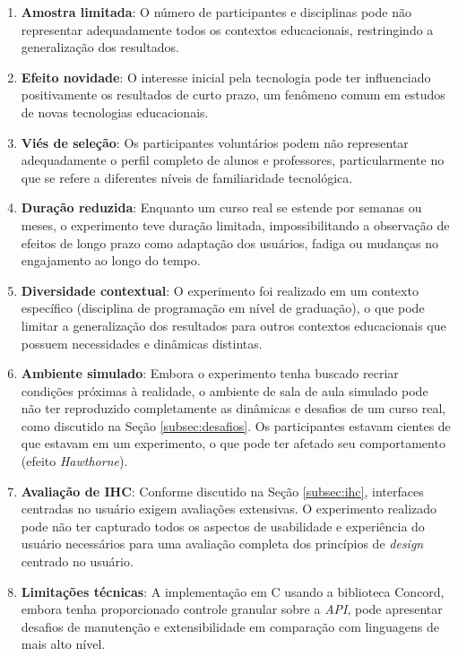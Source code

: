 \begin{enumerate}
\item \textbf{Amostra limitada}: O número de participantes e disciplinas pode
não representar adequadamente todos os contextos educacionais, restringindo a
generalização dos resultados.
\item \textbf{Efeito novidade}: O interesse inicial pela tecnologia pode ter
influenciado positivamente os resultados de curto prazo, um fenômeno comum em
estudos de novas tecnologias educacionais.
\item \textbf{Viés de seleção}: Os participantes voluntários podem não
representar adequadamente o perfil completo de alunos e professores,
particularmente no que se refere a diferentes níveis de familiaridade
tecnológica.
\item \textbf{Duração reduzida}: Enquanto um curso real se estende por semanas
ou meses, o experimento teve duração limitada, impossibilitando a observação de
efeitos de longo prazo como adaptação dos usuários, fadiga ou mudanças no
engajamento ao longo do tempo.
\item \textbf{Diversidade contextual}: O experimento foi realizado em um
contexto específico (disciplina de programação em nível de graduação), o que
pode limitar a generalização dos resultados para outros contextos educacionais
que possuem necessidades e dinâmicas distintas.
\item \textbf{Ambiente simulado}: Embora o experimento tenha buscado recriar
condições próximas à realidade, o ambiente de sala de aula simulado pode não ter
reproduzido completamente as dinâmicas e desafios de um curso real, como
discutido na Seção \ref{subsec:desafios}. Os participantes estavam cientes de
que estavam em um experimento, o que pode ter afetado seu comportamento (efeito
\textit{Hawthorne}).
\item \textbf{Avaliação de IHC}: Conforme discutido na Seção \ref{subsec:ihc},
interfaces centradas no usuário exigem avaliações extensivas. O experimento
realizado pode não ter capturado todos os aspectos de usabilidade e experiência
do usuário necessários para uma avaliação completa dos princípios de
\textit{design} centrado no usuário.
\item \textbf{Limitações técnicas}: A implementação em C usando a biblioteca
Concord, embora tenha proporcionado controle granular sobre a \textit{API}, pode
apresentar desafios de manutenção e extensibilidade em comparação com linguagens
de mais alto nível.
\end{enumerate}

